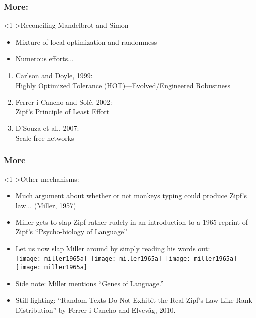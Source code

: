 \begin{frame}
  \frametitle{More:}

  \begin{block}<1->{Reconciling Mandelbrot and Simon}
      \begin{itemize}
      \item<1-> Mixture of local optimization and randomness 
      \item<2-> Numerous efforts...
      \end{itemize}
      \begin{enumerate}
      \item<2-> Carlson and Doyle, 1999:\\
        Highly Optimized Tolerance (HOT)---Evolved/Engineered Robustness\cite{carlson1999a,carlson2002a}
      \item<3-> Ferrer i Cancho and Sol\'{e}, 2002: \\
        Zipf's Principle of Least Effort\cite{ferrericancho2002a}
      \item<4-> D'Souza et al., 2007:\\ Scale-free networks\cite{dsouza2007a}
      \end{enumerate}
  \end{block}

\end{frame}

\begin{frame}
  \frametitle{More}

  \begin{block}<1->{Other mechanisms:}
    \begin{itemize}
    \item<+-> 
      Much argument about whether or not monkeys typing
      could produce Zipf's law... (Miller, 1957)\cite{miller1957a}
    \item<+-> 
      Miller gets to slap Zipf rather rudely in an introduction to
      a 1965 reprint of Zipf's ``Psycho-biology of Language''\cite{miller1965a,zipf1935a}
    \item<+-> 
      Let us now slap Miller around by simply reading his words out:\\
      \texttt{[image: miller1965a]}\,
      \texttt{[image: miller1965a]}\,
      \texttt{[image: miller1965a]}\,
      \texttt{[image: miller1965a]}

    \item<+-> 
      Side note: Miller mentions ``Genes of Language.''
    \item<+-> 
      Still fighting: ``Random Texts Do Not Exhibit the Real Zipf's 
      Law-Like Rank Distribution''\cite{ferrericancho2010a}
      by Ferrer-i-Cancho and Elvev\r{a}g, 2010.
    \end{itemize}
  \end{block}

\end{frame}


